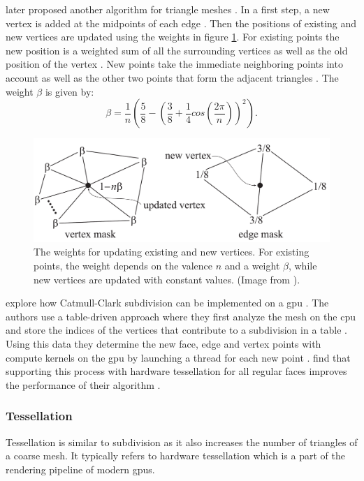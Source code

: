 \citeauthor{loop_subdivision} later proposed another algorithm for triangle meshes \cite{loop_subdivision}.
In a first step, a new vertex is added at the midpoints of each edge \cite{loop_subdivision}.
Then the positions of existing and new vertices are updated using the weights in figure \ref{fig:loop_subdivision}.
For existing points the new position is a weighted sum of all the surrounding vertices as well as the old position of the vertex \cite{loop_subdivision}.
New points take the immediate neighboring points into account as well as the other two points that form the adjacent triangles \cite{loop_subdivision}.
The weight $\beta$ is given by:
\begin{equation*}
    \beta = \frac{1}{n}(\frac{5}{8} - (\frac{3}{8} + \frac{1}{4}cos(\frac{2\pi}{n}))^2).
\end{equation*}
\begin{figure}[ht]
    \centering
    \includegraphics[width=0.5\linewidth]{img/loop_subdivision.png}
    \caption{The weights for updating existing and new vertices. For existing points, the weight depends on the valence $n$ and a weight $\beta$, while new vertices are updated with constant values. (Image from \cite{realtime}).}
    \label{fig:loop_subdivision}
\end{figure}

\citeauthor{niessner_subdivision} explore how Catmull-Clark subdivision can be implemented on a \ac{gpu} \cite{niessner_subdivision}.
The authors use a table-driven approach where they first analyze the mesh on the \ac{cpu} and store the indices of the vertices that contribute to a subdivision in a table \cite{niessner_subdivision}.
Using this data they determine the new face, edge and vertex points with compute kernels on the \ac{gpu} by launching a thread for each new point \cite{niessner_subdivision}.
\citeauthor{niessner_subdivision} find that supporting this process with hardware tessellation for all regular faces improves the performance of their algorithm \cite{niessner_subdivision}.


\subsubsection*{Tessellation}
Tessellation is similar to subdivision as it also increases the number of triangles of a coarse mesh.
It typically refers to hardware tessellation which is a part of the rendering pipeline of modern \acp{gpu}.


